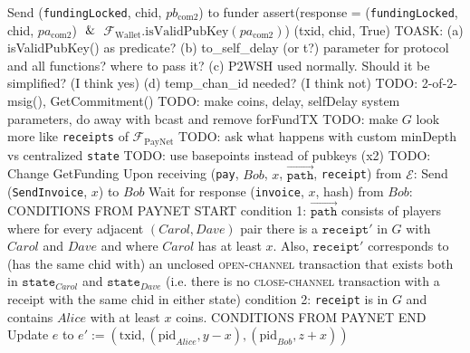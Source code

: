 \begin{algorithmic}[1]
      \Indent
        \State Send (\texttt{fundingLocked}, chid, $pb_{\mathrm{com}2}$) to
        funder
        \State assert(response = (\texttt{fundingLocked}, chid,
        $pa_{\mathrm{com}2}$) $\And$
        \Indent
          \State $\mathcal{F}_{\mathrm{Wallet}}.\mathrm{isValidPubKey}
          \left(pa_{\mathrm{com}2}\right)$)
        \EndIndent
      \EndIndent
      \State \Return (txid, chid, True)
    \EndFunction
    \State
    \State TOASK: (a) isValidPubKey() as predicate? (b) to\_self\_delay (or t?)
    parameter for protocol and all functions? where to pass it? (c) P2WSH used
    normally. Should it be simplified? (I think yes) (d) temp\_chan\_id needed?
    (I think not)
    \State TODO: 2-of-2-msig(), GetCommitment()
    \State TODO: make coins, delay, selfDelay system parameters, do away with
    bcast and remove forFundTX
    \State TODO: make $G$ look more like \texttt{receipts} of
    $\mathcal{F}_{\mathrm{PayNet}}$
    \State TODO: ask what happens with custom minDepth vs centralized
    \texttt{state}
    \State TODO: use basepoints instead of pubkeys (x2)
    \State TODO: Change GetFunding
    \State
    \State Upon receiving (\texttt{pay}, $Bob$, $x$,
    $\overrightarrow{\mathtt{path}}$, \texttt{receipt}) from $\mathcal{E}$:
      \State Send (\texttt{SendInvoice}, $x$) to $Bob$
      \State Wait for response (\texttt{invoice}, $x$, hash) from $Bob$:
      \Indent
        \State CONDITIONS FROM PAYNET START
        \State condition 1: $\overrightarrow{\mathtt{path}}$ consists of players
        where for every adjacent $\left(Carol, Dave\right)$ pair there is a
        $\mathtt{receipt}'$ in $G$ with $Carol$ and $Dave$ and where $Carol$ has
        at least $x$. Also, $\mathtt{receipt}'$ corresponds to (has the same
        chid with) an unclosed \textsc{open-channel} transaction that exists
        both in $\mathtt{state}_{Carol}$ and $\mathtt{state}_{Dave}$ (i.e. there
        is no \textsc{close-channel} transaction with a receipt with the same
        chid in either state)
        \State condition 2: \texttt{receipt} is in $G$ and contains $Alice$ with
        at least $x$ coins.
        \State CONDITIONS FROM PAYNET END
      \EndIndent
        \State Update $e$ to $e' := \left(\mathrm{txid},
        \left(\mathrm{pid}_{Alice}, y - x\right),
        \left(\mathrm{pid}_{Bob}, z + x\right)\right)$ 
\end{algorithmic}
